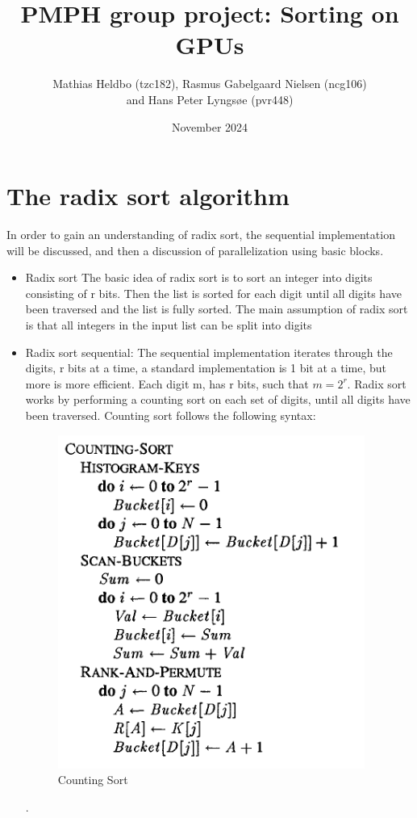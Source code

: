 \documentclass{article}
\title{PMPH group project: Sorting on GPUs}
\author{Mathias Heldbo (tzc182), Rasmus Gabelgaard Nielsen (ncg106) \\ and Hans Peter Lyngsøe (pvr448)}
\date{November 2024}
\begin{document}
\maketitle

\section{The radix sort algorithm }
In order to gain an understanding of radix sort, the sequential implementation will be discussed, and then a discussion of parallelization using basic blocks. 
\begin{itemize}
\item Radix sort
The basic idea of radix sort is to sort an integer into digits consisting of r bits. Then the list is sorted for each digit until all digits have been traversed and the list is fully sorted. The main assumption of radix sort is that all integers in the input list can be split into digits
\item Radix sort sequential:
The sequential implementation iterates through the digits, r bits at a time, a standard implementation is 1 bit at a time, but more is more efficient. Each digit m, has r bits, such that $m = 2^r$. Radix sort works by performing a counting sort on each set of digits, until all digits have been traversed. Counting sort follows the following syntax: 
\begin{figure} [H]
    \includegraphics[width=0.5\linewidth]{images/count_sort.PNG}
    \caption{Counting Sort \citep{zagharadixvector}}
    \label{fig:enter-label}
\end{figure}.


\end{itemize}
\end{document}
